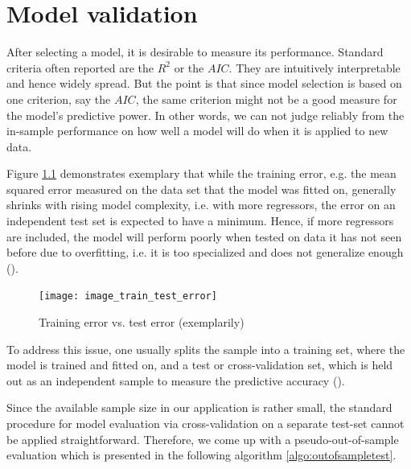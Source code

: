 \documentclass[a4paper, 12pt]{scrreprt}
\begin{document}
\chapter{Model validation}\label{par:modelvalidation}

After selecting a model, it is desirable to measure its performance. Standard criteria often reported are the $R^2$ or the $AIC$. They are intuitively interpretable and hence widely spread. But the point is that since model selection is based on one criterion, say the $AIC$, the same criterion might not be a good measure for the model's predictive power. In other words, we can not judge reliably from the in-sample performance on how well a model will do when it is applied to new data.

Figure \ref{train_test} demonstrates exemplary that while the training error, e.g. the mean squared error measured on the data set that the model was fitted on, generally shrinks with rising model complexity, i.e. with more regressors, the error on an independent test set is expected to have a minimum. Hence, if more regressors are included, the model will perform poorly when tested on data it has not seen before due to overfitting, i.e. it is too specialized and does not generalize enough (\textcite[p. 2]{hawkins2004overfitting}).

\begin{figure}[H]
	\texttt{[image: image\_train\_test\_error]}
	\centering
	\caption{Training error vs. test error (exemplarily)}
	\label{train_test}
\end{figure}

To address this issue, one usually splits the sample into a training set, where the model is trained and fitted on, and a test or cross-validation set, which is held out as an independent sample to measure the predictive accuracy (\textcite[p. 5]{hawkins2004overfitting}).

Since the available sample size in our application is rather small, the standard procedure for model evaluation via cross-validation on a separate test-set cannot be applied straightforward. Therefore, we come up with a pseudo-out-of-sample evaluation which is presented in the following algorithm \ref{algo:outofsampletest}.
\end{document}
